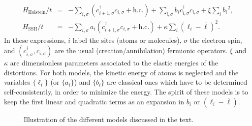 \documentclass[]{revtex4-1}
\begin{document}
\begin{eqnarray}
\label{hol-ssh}
H_{\text{Holstein}}/t &=& -\sum_{i,\sigma} (c_{i+1,\sigma}^{\dagger} c_{i,\sigma} + \mbox{h.c.})+ \sum_{i,\sigma} b_i c_{i,\sigma}^{\dagger} c_{i,\sigma} + \xi \sum_i {b_i}^2, \\
H_{\text{SSH}}/t &=& -\sum_{i,\sigma} a_i (c_{i+1,\sigma}^{\dagger} c_{i,\sigma} + \mbox{h.c.})+  \kappa \sum_i (\ell_i-\bar{\ell})^2. \label{sshH}
\end{eqnarray}
In these expressions, $i$ label the sites (atoms or molecules), $\sigma$ the electron spin, and $(c_{i,\sigma}^{\dagger}, c_{i,\sigma})$ are the usual (creation/annihilation) fermionic operators. $\xi$ and $\kappa$ are dimensionless parameters associated to the elastic energies of the distortions. For both models, the kinetic energy of atoms is neglected and the variables $\{\ell_i\}$ (or $\{a_i\}$) and $\{b_i\}$ are classical ones which have to be determined self-consistently, in order to minimize the energy. The spirit of these models is to keep the first linear and quadratic terms as an expansion in $b_i$ or $(\ell_i-\bar{\ell})$.

 \begin{figure}[t]
\begin{center}   
\end{center}        \caption{Illustration of the different models discussed in the text.}
  \label{models}
 \end{figure}
\end{document}
